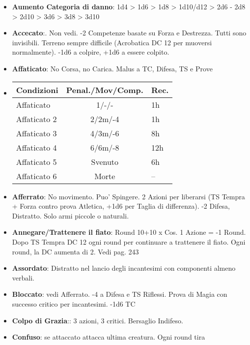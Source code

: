 \documentclass[landscape,10pt,a4paper]{article}
\begin{document}
\pagestyle{empty}



\begin{multicols}{3}

\footnotesize

\begin{dmbox}[title=Condizioni]
	
	\begin{itemize}[leftmargin=0.5cm,itemsep=-1pt,parsep=0pt]
		\item \textbf{Aumento Categoria di danno}: 1d4 > 1d6 > 1d8 > 1d10/d12 > 2d6 - 2d8 > 2d10 > 3d6 > 3d8 > 3d10
		\item \textbf{Accecato}:. Non vedi. -2  Competenze basate su Forza e Destrezza. Tutti sono invisibili. Terreno sempre difficile (Acrobatica DC 12 per muoversi normalmente). -1d6 a colpire, +1d6 a essere colpito.
		\item \textbf{Affaticato}: No Corsa, no Carica. Malus a TC, Difesa, TS e Prove
		\item
\begin{tabular}{lcl}
	\textbf{Condizioni}& \textbf{Penal./Mov/Comp.}&\textbf{Rec.}\\
	\hline
	Affaticato  &1/-/-&1h\\
	Affaticato 2&2/2m/-4&1h\\
	Affaticato 3&4/3m/-6&8h\\
	Affaticato 4&6/6m/-8&12h\\
	Affaticato 5&Svenuto&6h\\
	Affaticato 6&Morte&--
\end{tabular}
		\item \textbf{Afferrato}: No movimento. Puo' Spingere. 2 Azioni per liberarsi (TS Tempra + Forza contro prova Atletica, +1d6 per Taglia di differenza). -2 Difesa, Distratto. Solo armi piccole o naturali.
		\item \textbf{Annegare/Trattenere il fiato}: Round 10+10 x Cos. 1 Azione = -1 Round. Dopo TS Tempra DC 12 ogni round per continuare a trattenere il fiato. Ogni round, la DC aumenta di 2. Vedi pag. 243
		\item \textbf{Assordato}: Distratto nel lancio degli incantesimi con componenti almeno verbali.
		\item \textbf{Bloccato}: vedi Afferrato. -4 a Difesa e TS Riflessi. Prova di Magia con successo critico per incantesimi. -1d6 TC
		\item \textbf{Colpo di Grazia}:: 3 azioni, 3 critici. Bersaglio Indifeso.
		\item \textbf{Confuso}: se attaccato attacca ultima creatura. Ogni round tira
		

\end{itemize}
\end{dmbox}
\end{multicols}
\end{document}
